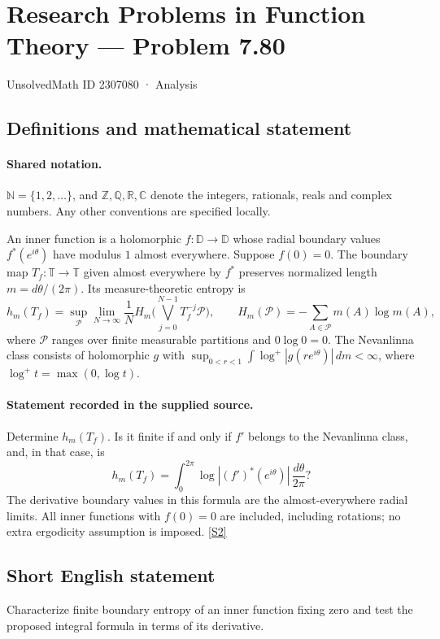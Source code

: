 \documentclass[11pt]{article}
\newcommand{\sref}[2]{\hyperlink{source:#1:#2}{[S#2]}}
\begin{document}
\setcounter{section}{2307079}
\section{Research Problems in Function Theory — Problem 7.80}\label{2307080}
{\small\sffamily UnsolvedMath ID 2307080 · Analysis}
\subsection{Definitions and mathematical statement}

\paragraph{Shared notation.}$\mathbb N=\{1,2,\ldots\}$, and $\mathbb Z,\mathbb Q,\mathbb R,\mathbb C$ denote the integers, rationals, reals and complex numbers. Any other conventions are specified locally.


An inner function is a holomorphic $f:\mathbb D\to\mathbb D$ whose radial boundary values $f^*(e^{i\theta})$ have modulus $1$ almost everywhere. Suppose $f(0)=0$. The boundary map $T_f:\mathbb T\to\mathbb T$ given almost everywhere by $f^*$ preserves normalized length $m=d\theta/(2\pi)$. Its measure-theoretic entropy is
\[h_m(T_f)=\sup_{\mathcal P}\lim_{N\to\infty}\frac1N
H_m\Big(\bigvee_{j=0}^{N-1}T_f^{-j}\mathcal P\Big),
\qquad H_m(\mathcal P)=-\sum_{A\in\mathcal P}m(A)\log m(A),
\]
where $\mathcal P$ ranges over finite measurable partitions and $0\log0=0$. The Nevanlinna class consists of holomorphic $g$ with $\sup_{0<r<1}\int\log^+|g(re^{i\theta})|\,dm<\infty$, where $\log^+t=\max(0,\log t)$.
\paragraph{Statement recorded in the supplied source.}
Determine $h_m(T_f)$. Is it finite if and only if $f'$ belongs to the Nevanlinna class, and, in that case, is
\[h_m(T_f)=\int_0^{2\pi}\log|(f')^*(e^{i\theta})|\,\frac{d\theta}{2\pi}?
\]
The derivative boundary values in this formula are the almost-everywhere radial limits. All inner functions with $f(0)=0$ are included, including rotations; no extra ergodicity assumption is imposed. \sref{2307080}{2}
\subsection{Short English statement}
Characterize finite boundary entropy of an inner function fixing zero and test the proposed integral formula in terms of its derivative.
\end{document}
